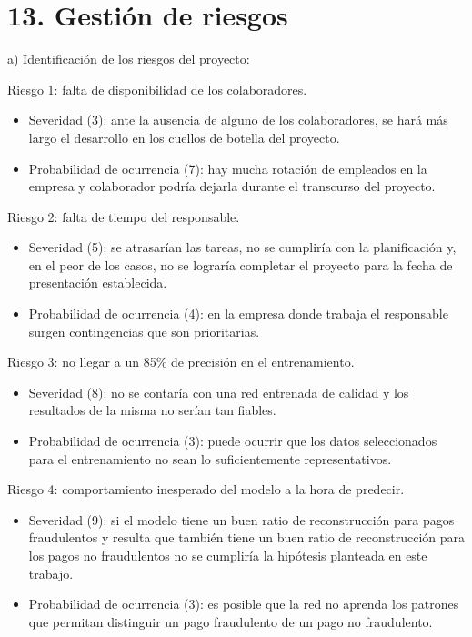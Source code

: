 \documentclass[
11pt, %
]{charter}
\begin{document}
\section{13. Gestión de riesgos}
\label{sec:riesgos}

a) Identificación de los riesgos del proyecto:

Riesgo 1: falta de disponibilidad de los colaboradores.
\begin{itemize}
	\item Severidad (3): ante la ausencia de alguno de los colaboradores, se hará más largo el desarrollo en los cuellos de botella del proyecto.
	\item Probabilidad de ocurrencia (7): hay mucha rotación de empleados en la empresa y colaborador podría dejarla durante el transcurso del proyecto. 
\end{itemize}

Riesgo 2: falta de tiempo del responsable.
\begin{itemize}
	\item Severidad (5): se atrasarían las tareas, no se cumpliría con la planificación y, en el peor de los casos, no se lograría completar el proyecto para la fecha de presentación establecida.
	\item Probabilidad de ocurrencia (4): en la empresa donde trabaja el responsable surgen contingencias que son prioritarias. 
\end{itemize}   

Riesgo 3: no llegar a un 85\% de precisión en el entrenamiento. 
\begin{itemize}
	\item Severidad (8): no se contaría con una red entrenada de calidad y los resultados de la misma no serían tan fiables.
	\item Probabilidad de ocurrencia (3): puede ocurrir que los datos seleccionados para el entrenamiento no sean lo suficientemente representativos. 
\end{itemize}

Riesgo 4: comportamiento inesperado del modelo a la hora de predecir. 
\begin{itemize}
	\item Severidad (9): si el modelo tiene un buen ratio de reconstrucción para pagos fraudulentos y resulta que también tiene un buen ratio de reconstrucción para los pagos no fraudulentos no se cumpliría la hipótesis planteada en este trabajo.
	\item Probabilidad de ocurrencia (3): es posible que la red no aprenda los patrones que permitan distinguir un pago fraudulento de un pago no fraudulento.
\end{itemize}
\end{document}
